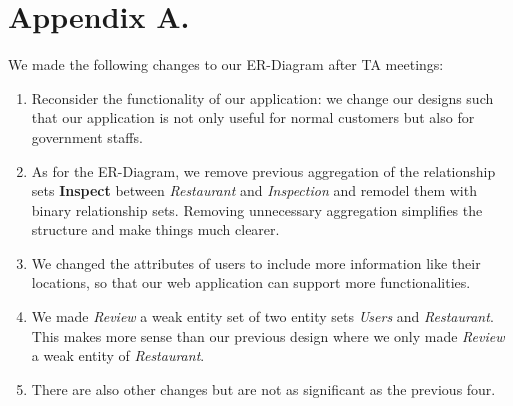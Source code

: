 \documentclass[a4paper,12pt]{article}
\theoremstyle{definition}
\begin{document}
\section{Appendix A.}
We made the following changes to our ER-Diagram after TA meetings:
\begin{enumerate}
    \item Reconsider the functionality of our application: we change our designs such that our application is not only useful for normal customers but also for government staffs.
    \item As for the ER-Diagram, we remove previous aggregation of the relationship sets \textbf{Inspect} between \textit{Restaurant} and \textit{Inspection} and remodel them with binary relationship sets. Removing unnecessary aggregation simplifies the structure and make things much clearer.
    \item We changed the attributes of users to include more information like their locations, so that our web application can support more functionalities.
    \item We made \textit{Review} a weak entity set of two entity sets \textit{Users} and \textit{Restaurant}. This makes more sense than our previous design where we only made \textit{Review} a weak entity of \textit{Restaurant}.
    \item There are also other changes but are not as significant as the previous four.
\end{enumerate}
\end{document}
